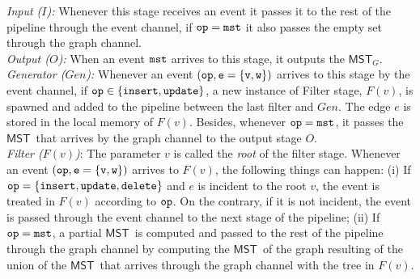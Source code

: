 \documentclass[runningheads,UKenglish]{llncs}
\newcounter{instance}
\newcommand{\mst}{$\mathsf{MST}$}
\newcommand{\mstof}[1]{$\mathsf{MST}_{#1}$}
\begin{document}
\noindent
\emph{Input ($I$):} Whenever this stage receives an event it passes 
it to the rest of the pipeline through the event channel, if ${\tt op} ={\tt mst}$
it also passes the empty set through the graph channel.\\
%
\noindent
\emph{Output ($O$):} When an event ${\tt mst}$  
arrives to this stage, it outputs the \mstof{G}.\\
%
\emph{Generator ($Gen$):} Whenever an 
event $({\tt op,e=\{v,w\}})$ arrives to this stage  
by the event channel, if ${\tt op}\in\{{\tt insert, update}\}$, a new instance of
Filter stage, $F(v)$, is spawned and added to the pipeline 
between the last filter and $Gen$. The edge $e$ is stored in the local memory of $F(v)$. Besides, whenever 
${\tt op}={\tt mst}$, it passes the \mst\ that arrives by the graph channel 
to the output stage $O$.\\
%
\noindent
\emph{Filter ($F(v)$)}: The parameter $v$ is called the \emph{root} of the 
filter stage. Whenever an event $({\tt op,e=\{v,w\})}$ arrives to $F(v)$, the following things
can happen:  (i) If ${\tt op}=\{{\tt insert, update, delete}\}$ and $e$ is incident to
the root $v$, the event is treated in $F(v)$ according to ${\tt op}$. On the contrary, if it is not incident, the event is passed through the event channel to the next
stage of the pipeline; (ii) If ${\tt op}={\tt mst}$,  a partial \mst\ is computed and
passed to the rest of the pipeline through the graph channel by 
computing the \mst\ of the graph resulting of the union of the 
\mst\ that arrives through  the graph channel with the tree in $F(v)$. 
%
\vspace{-2em}
\end{document}
